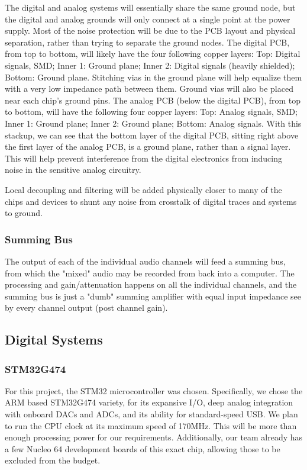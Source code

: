 \documentclass[11pt, letterpaper,titlepage]{article}
\begin{document}
The digital and analog systems will essentially share the same ground node, but the digital and analog grounds will only connect at a single point at the power supply. Most of the noise protection will be due to the PCB layout and physical separation, rather than trying to separate the ground nodes. The digital PCB, from top to bottom, will likely have the four following copper layers: Top: Digital signals, SMD; Inner 1: Ground plane; Inner 2: Digital signals (heavily shielded); Bottom: Ground plane. Stitching vias in the ground plane will help equalize them with a very low impedance path between them. Ground vias will also be placed near each chip's ground pins. The analog PCB (below the digital PCB), from top to bottom, will have the following four copper layers: Top: Analog signals, SMD; Inner 1: Ground plane; Inner 2: Ground plane; Bottom: Analog signals. With this stackup, we can see that the bottom layer of the digital PCB, sitting right above the first layer of the analog PCB, is a ground plane, rather than a signal layer. This will help prevent interference from the digital electronics from inducing noise in the sensitive analog circuitry.

Local decoupling and filtering will be added physically closer to many of the chips and devices to shunt any noise from crosstalk of digital traces and systems to ground.

\subsubsection*{Summing Bus}
The output of each of the individual audio channels will feed a summing bus, from which the "mixed" audio may be recorded from back into a computer. The processing and gain/attenuation happens on all the individual channels, and the summing bus is just a "dumb" summing amplifier with equal input impedance see by every channel output (post channel gain).



\subsection{Digital Systems}

\subsubsection*{STM32G474}
For this project, the STM32 microcontroller was chosen. Specifically, we chose the ARM based STM32G474 variety, for its expansive I/O, deep analog integration with onboard DACs and ADCs, and its ability for standard-speed USB. We plan to run the CPU clock at its maximum speed of 170MHz. This will be more than enough processing power for our requirements. Additionally, our team already has a few Nucleo 64 development boards of this exact chip, allowing those to be excluded from the budget.
\end{document}
